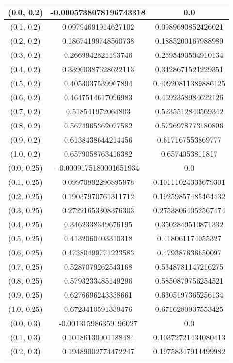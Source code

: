 \begin{table}[H]
\begin{tabular}{|c|c|c|}
\hline
(0.0, 0.2) & -0.0005738078196743318 & 0.0 \\
\hline
(0.1, 0.2) & 0.09794691914627102 & 0.0989690852426021 \\
\hline
(0.2, 0.2) & 0.18674199748560738 & 0.1885200167988989 \\
\hline
(0.3, 0.2) & 0.2669942821193746 & 0.2695490504910134 \\
\hline
(0.4, 0.2) & 0.33960387628622113 & 0.3428671521229351 \\
\hline
(0.5, 0.2) & 0.4053037539967894 & 0.40920811389886125 \\
\hline
(0.6, 0.2) & 0.4647514617096983 & 0.4692358984622126 \\
\hline
(0.7, 0.2) & 0.518541972064803 & 0.5235512840569342 \\
\hline
(0.8, 0.2) & 0.5674965362077582 & 0.5726978773180896 \\
\hline
(0.9, 0.2) & 0.6138438644214456 & 0.617167553869777 \\
\hline
(1.0, 0.2) & 0.6579058763416382 & 0.6574053811817 \\
\hline
\hline
(0.0, 0.25) & -0.0009175180001651934 & 0.0 \\
\hline
(0.1, 0.25) & 0.09970892296895978 & 0.10111024333679301 \\
\hline
(0.2, 0.25) & 0.19037970761311712 & 0.19259857485464432 \\
\hline
(0.3, 0.25) & 0.27221653308376303 & 0.27538064052567474 \\
\hline
(0.4, 0.25) & 0.3462338349676195 & 0.3502849510871332 \\
\hline
(0.5, 0.25) & 0.4132060403310318 & 0.418061174055327 \\
\hline
(0.6, 0.25) & 0.47380499771223583 & 0.479387636650097 \\
\hline
(0.7, 0.25) & 0.5287079262543168 & 0.5348781147216275 \\
\hline
(0.8, 0.25) & 0.5793233485149296 & 0.5850879756254521 \\
\hline
(0.9, 0.25) & 0.6276696243338661 & 0.6305197365256134 \\
\hline
(1.0, 0.25) & 0.6723410591339476 & 0.6716280937553425 \\
\hline
\hline
(0.0, 0.3) & -0.001315986359196027 & 0.0 \\
\hline
(0.1, 0.3) & 0.10186130001188484 & 0.10372721434080413 \\
\hline
(0.2, 0.3) & 0.19489002774472247 & 0.19758347914499982 \\

\end{tabular}
\end{table}
